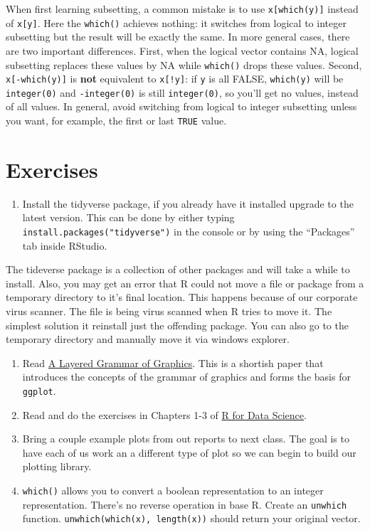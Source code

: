 \documentclass[]{book}
\providecommand{\tightlist}{%
  \setlength{\itemsep}{0pt}\setlength{\parskip}{0pt}}
\theoremstyle{definition}
\theoremstyle{definition}
\theoremstyle{definition}
\theoremstyle{remark}
\begin{document}
When first learning subsetting, a common mistake is to use
\texttt{x{[}which(y){]}} instead of \texttt{x{[}y{]}}. Here the
\texttt{which()} achieves nothing: it switches from logical to integer
subsetting but the result will be exactly the same. In more general
cases, there are two important differences. First, when the logical
vector contains NA, logical subsetting replaces these values by NA while
\texttt{which()} drops these values. Second, \texttt{x{[}-which(y){]}}
is \textbf{not} equivalent to \texttt{x{[}!y{]}}: if \texttt{y} is all
FALSE, \texttt{which(y)} will be \texttt{integer(0)} and
\texttt{-integer(0)} is still \texttt{integer(0)}, so you'll get no
values, instead of all values. In general, avoid switching from logical
to integer subsetting unless you want, for example, the first or last
\texttt{TRUE} value.

\hypertarget{exercises-3}{%
\section{Exercises}\label{exercises-3}}

\begin{enumerate}
\def\labelenumi{\arabic{enumi}.}
\tightlist
\item
  Install the tidyverse package, if you already have it installed
  upgrade to the latest version. This can be done by either typing
  \texttt{install.packages("tidyverse")} in the console or by using the
  ``Packages'' tab inside RStudio.
\end{enumerate}

The tideverse package is a collection of other packages and will take a
while to install. Also, you may get an error that R could not move a
file or package from a temporary directory to it's final location. This
happens because of our corporate virus scanner. The file is being virus
scanned when R tries to move it. The simplest solution it reinstall just
the offending package. You can also go to the temporary directory and
manually move it via windows explorer.

\begin{enumerate}
\def\labelenumi{\arabic{enumi}.}
\setcounter{enumi}{1}
\item
  Read \href{http://vita.had.co.nz/papers/layered-grammar.pdf}{A Layered
  Grammar of Graphics}. This is a shortish paper that introduces the
  concepts of the grammar of graphics and forms the basis for
  \texttt{ggplot}.
\item
  Read and do the exercises in Chapters 1-3 of
  \href{http://r4ds.had.co.nz/}{R for Data Science}.
\item
  Bring a couple example plots from out reports to next class. The goal
  is to have each of us work an a different type of plot so we can begin
  to build our plotting library.
\item
  \texttt{which()} allows you to convert a boolean representation to an
  integer representation. There's no reverse operation in base R. Create
  an \texttt{unwhich} function. \texttt{unwhich(which(x),\ length(x))}
  should return your original vector.
\end{enumerate}
\end{document}
